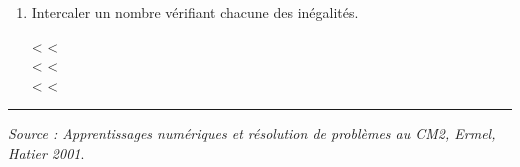 \begin{activite}
\begin{enumerate}
            \medskip
            \item Intercaler un nombre vérifiant chacune des inégalités.
            
            \medskip
              < \makebox[0.35\linewidth]{\dotfill} <    \\
                        < \makebox[0.35\linewidth]{\dotfill} <    \\
                     < \makebox[0.35\linewidth]{\dotfill} <   
        \end{enumerate}
    \vspace*{-3mm}
    \vfill\hrule\hfill{\it\footnotesize Source : Apprentissages numériques et résolution de problèmes au CM2, Ermel, Hatier 2001}.
 \end{activite}
 